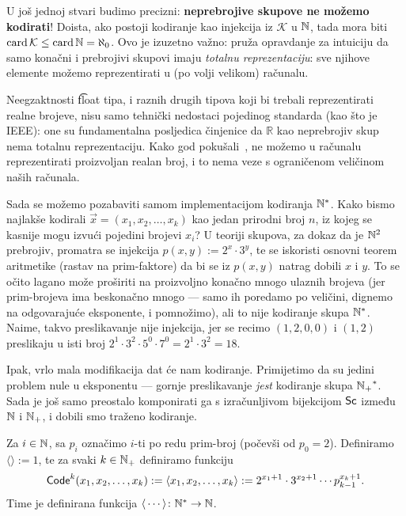 \begin{napomena}
U još jednoj stvari budimo precizni: \textbf{neprebrojive skupove ne možemo kodirati}! Doista, ako postoji kodiranje kao injekcija iz $\mathcal K$ u ${\mathbb N}$, tada mora biti $\operatorname{card}\mathcal K\le\operatorname{card}{\mathbb N}=\aleph_0$. Ovo je izuzetno važno: pruža opravdanje za intuiciju da samo konačni i prebrojivi skupovi imaju \emph{totalnu reprezentaciju}: sve njihove elemente možemo reprezentirati u (po volji velikom) računalu. 

Neegzaktnosti \t{float} tipa, i raznih drugih tipova koji bi trebali reprezentirati realne brojeve, nisu samo tehnički nedostaci pojedinog standarda (kao što je IEEE): one su fundamentalna posljedica činjenice da $\mathbb R$ kao neprebrojiv skup nema totalnu reprezentaciju. Kako god pokušali~\cite{url:calc}, ne možemo u računalu reprezentirati proizvoljan realan broj, i to nema veze s ograničenom veličinom naših 
računala.
\end{napomena}

Sada se možemo pozabaviti samom implementacijom kodiranja ${\mathbb N}^*$. Kako bismo najlakše kodirali $\vec x=(x_1,x_2,\dotsc,x_k)$ kao jedan prirodni broj $n$, iz kojeg se kasnije mogu izvući pojedini brojevi $x_i$? U teoriji skupova, za dokaz da je ${\mathbb N}^2$ prebrojiv, promatra se injekcija $p(x,y):=2^x\cdot3^y$, te se iskoristi osnovni teorem aritmetike (rastav na prim-faktore) da bi se iz $p(x,y)$ natrag dobili $x$ i $y$. To se očito lagano može proširiti na proizvoljno konačno mnogo ulaznih brojeva (jer prim-brojeva ima beskonačno mnogo --- samo ih poredamo po veličini, dignemo na odgovarajuće eksponente, i pomnožimo), ali to nije kodiranje skupa ${\mathbb N}^*$. Naime, takvo preslikavanje nije injekcija, jer se recimo $(1,2,0,0)$ i $(1,2)$ preslikaju u isti broj $2^1\cdot3^2\cdot5^0\cdot7^0=2^1\cdot3^2=18$.

Ipak, vrlo mala modifikacija dat će nam kodiranje. Primijetimo da su jedini problem nule u eksponentu --- gornje preslikavanje \emph{jest} kodiranje skupa ${{\mathbb N}_+}^*$. Sada je još samo preostalo komponirati ga s izračunljivom bijekcijom $\mathsf{Sc}$ između ${\mathbb N}$ i ${\mathbb N}_+$, i dobili smo traženo kodiranje.

\begin{definicija}
Za $i\in{\mathbb N}$, sa $p_i$ označimo $i$-ti po redu prim-broj (počevši od $p_0=2$). Definiramo $\langle\rangle:=1$, te za svaki $k\in{\mathbb N}_+$ definiramo funkciju
\begin{equation}\label{eq:Codek}
    \mathsf{Code}^k(x_1,x_2,\dotsc,x_k):=\langle x_1,x_2,\dotsc,x_k\rangle:=2^{x_1+1}\cdot3^{x_2+1}\dotsm p_{k-1}^{x_k+1}\text.
\end{equation}
Time je definirana funkcija $\langle\,\cdots\rangle\colon{\mathbb N}^*\to{\mathbb N}$.
\end{definicija}

